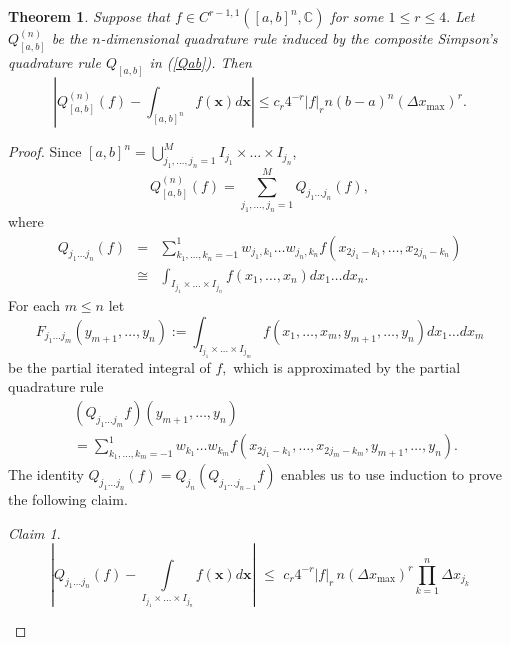 \documentclass{birkjour}
\newtheorem{thm}{Theorem}[section]
\theoremstyle{definition}
\theoremstyle{remark}
\newtheorem*{claim}{Claim}
\numberwithin{equation}{section}
\begin{document}
\begin{thm}\label{thmcompbound}
Suppose that $f \in C^{r-1,1}([a,b]^n,\mathbb C)$ for some $1\leq r \leq 4.$ Let $Q_{[a,b]}^{(n)}$ be the $n$-dimensional quadrature rule induced by the composite Simpson's quadrature rule $Q_{[a,b]}$ in (\ref{Qab}). Then
\begin{equation}
 \left| Q_{[a,b]}^{(n)}(f) - \int_{[a,b]^n} f(\mathbf{x}) d\mathbf{x}  \right| \leq c_r  4^{-r}  |f|_r n(b-a)^n  (\Delta x_{\operatorname{max}})^r.
\end{equation}
\end{thm}
\begin{proof}
Since 
   $ [a,b]^n = \bigcup_{j_1,\dots,j_n=1}^M I_{j_1} \times \dots \times I_{j_n}$,
\begin{equation}\label{Qnfab}
    Q_{[a,b]}^{(n)}(f) = \sum_{j_1, \dots, j_n=1}^M Q_{j_1 \dots j_n}(f),
\end{equation}
where
\begin{eqnarray} \nonumber 
    Q_{j_1 \dots j_n}(f) &=& \sum_{k_1, \dots, k_n = -1}^{1} w_{j_1,k_1} \dots w_{j_n,k_n} f(x_{2j_1 - k_1}, \dots, x_{2j_n - k_n})\\  
    &\cong& \int_{I_{j_1}\times \dots \times I_{j_n}} f(x_1,\dots, x_n) dx_1 \dots dx_n.
\end{eqnarray}
For each $m \leq n$ let 
\begin{equation}
    F_{j_1 \dots j_m}(y_{m+1}, \dots, y_n) := \int_{I_{j_1} \times \dots \times I_{j_m}} f(x_1, \dots, x_m, y_{m+1}, \dots, y_n) dx_1 \dots dx_m
\end{equation}
be the partial iterated integral of $f,$ which is approximated by the partial quadrature rule 
\begin{align}
    &(Q_{j_1 \dots j_m} f)(y_{m+1}, \dots, y_n)  
    \nonumber
    \\
    &= \sum_{k_1, \dots, k_m = -1}^1  w_{k_1}\dots w_{k_m} f(x_{2j_1 - k_1}, \dots, x_{2j_m - k_m}, y_{m+1}, \dots, y_n).  
\end{align}
The identity $Q_{j_1 \dots j_n}(f)  = Q_{j_n} (Q_{j_1 \dots j_{n-1}} f)$
enables us to use  induction to prove the following claim. 

\begin{claim}
\begin{equation}\label{anclaim}
    \left|  Q_{j_1 \dots j_n}(f) - \int\limits_{I_{j_1} \times \dots \times I_{j_n}}  f(\mathbf x) d\mathbf{x}   \right| 
     \,\,\leq\,\,
     c_r 4^{-r}|f|_r \,n     (\Delta x_{\operatorname{max}})^{r}  
     \prod\limits_{k=1}^n \Delta x_{j_k}
\end{equation}
\end{claim}


\end{proof}
\end{document}
